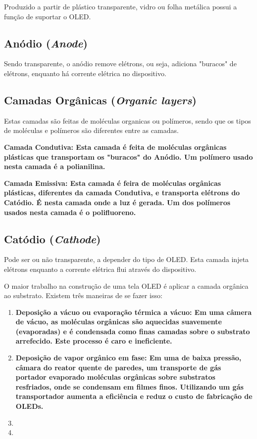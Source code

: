 Produzido a partir de plástico transparente, vidro ou folha metálica possui a função de suportar o OLED.


\subsection{Anódio (\textit{Anode})}
\label{sec:substrato}

Sendo transparente, o anódio remove elétrons, ou seja, adiciona "buracos" de elétrons, enquanto há corrente elétrica no dispositivo.


\subsection{Camadas Orgânicas (\textit{Organic layers})}
\label{sec:substrato}

Estas camadas são feitas de moléculas organicas ou polímeros, sendo que os tipos de moléculas e polímeros são diferentes entre as camadas.

\bf{Camada Condutiva:} Esta camada é feita de moléculas orgânicas plásticas que transportam os "buracos" do Anódio. Um polímero usado nesta camada é a polianilina.

\bf{Camada Emissiva:} Esta camada é feira de moléculas orgânicas plásticas, diferentes da camada Condutiva, e transporta elétrons do Catódio. É nesta camada onde a luz é gerada. Um dos polímeros usados nesta camada é o polifluoreno. 


\subsection{Catódio (\textit{Cathode})}
\label{sec:substrato}

Pode ser ou não transparente, a depender do tipo de OLED. Esta camada injeta elétrons enquanto a corrente elétrica flui através do dispositivo. 

O maior trabalho na construção de uma tela OLED é aplicar a camada orgânica ao substrato. Existem três maneiras de se fazer isso:

\begin{enumerate}
\item \bf{Deposição a vácuo ou evaporação térmica a vácuo:} Em uma câmera de vácuo, as moléculas orgânicas são aquecidas suavemente (evaporadas) e é condensada como finas camadas sobre o substrato arrefecido. Este processo é caro e ineficiente.

\item \bf{Deposição de vapor orgânico em fase:} Em uma de baixa pressão, câmara do reator quente de paredes, um transporte de gás portador evaporado moléculas orgânicas sobre substratos resfriados, onde se condensam em filmes finos. Utilizando um gás transportador aumenta a eficiência e reduz o custo de fabricação de OLEDs.
\item 
\item 
\end{enumerate}



